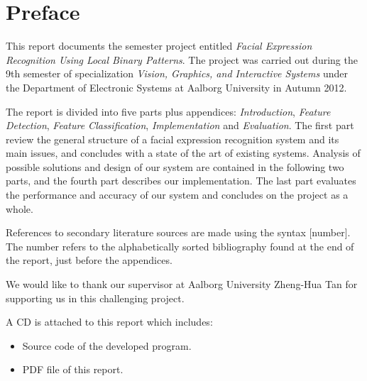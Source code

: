 \thispagestyle{plain}
\hypersetup{bookmarksdepth=-2} %
\chapter*{Preface}
\hypersetup{bookmarksdepth}%

\noindent This report documents the semester project entitled \textit{Facial Expression Recognition Using Local Binary Patterns}. The project was carried out during the 9th semester of specialization \textit{Vision, Graphics, and Interactive Systems} under the Department of Electronic Systems at Aalborg University in Autumn 2012. 
\newline

\noindent The report is divided into five parts plus appendices: \textit{Introduction}, \textit{Feature Detection}, \textit{Feature Classification}, \textit{Implementation} and \textit{Evaluation}. The first part review the general structure of a facial expression recognition system and its main issues, and concludes with a state of the art of existing systems. Analysis of possible solutions and design of our system are contained in the following two parts, and the fourth part describes our implementation. The last part evaluates the performance and accuracy of our system and concludes on the project as a whole. 
\newline

\noindent References to secondary literature sources are made using the syntax [number]. The number refers to the alphabetically sorted bibliography found at the end of the report, just before the appendices.
\newline

\noindent We would like to thank our supervisor at Aalborg University Zheng-Hua Tan for supporting us in this challenging project. 
\newline

\noindent A CD is attached to this report which includes:
\begin{itemize}
\item Source code of the developed program.
\item PDF file of this report.
\end{itemize}

